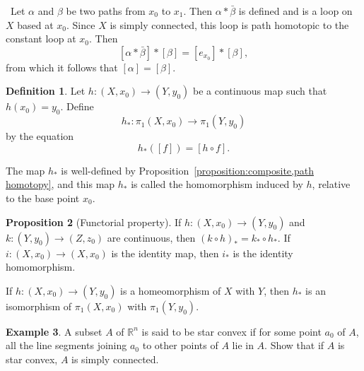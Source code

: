 \documentclass[12pt,a4paper]{book}
\newenvironment{prooff}{{\noindent\it\textcolor{cyan!40!black}{Proof}:}\,}{\par}
\theoremstyle{definition}
\newtheorem{defn}{Definition}[section]
\newtheorem{prop}[defn]{Proposition}
\newtheorem{exam}[defn]{Example}
\begin{document}
\begin{prooff}
    Let $\alpha$ and $\beta$ be two paths from $x_0$ to $x_1$. Then $\alpha * \bar{\beta}$ is defined and is a loop on $X$ based at $x_0$. Since $X$ is simply connected, this loop is path homotopic to the constant loop at $x_0$. Then
    $$
        [\alpha * \bar{\beta}] *[\beta]=\left[e_{x_0}\right] *[\beta],
    $$
    from which it follows that $[\alpha]=[\beta]$.
\end{prooff}
\begin{defn}
    Let $h:\left(X, x_0\right) \rightarrow\left(Y, y_0\right)$ be a continuous map such that $h(x_0)=y_0$. Define
    $$
        h_*: \pi_1\left(X, x_0\right) \longrightarrow \pi_1\left(Y, y_0\right)
    $$
    by the equation
    $$
        h_*([f])=[h \circ f] .
    $$

    The map $h_*$ is well-defined by Proposition~\ref{proposition:composite,path homotopy}, and this map $h_*$ is called the homomorphism induced by $h$, relative to the base point $x_0$.
\end{defn}
\begin{prop}[Functorial property]
    If $h:\left(X, x_0\right) \rightarrow\left(Y, y_0\right)$ and $k:\left(Y, y_0\right) \rightarrow\left(Z, z_0\right)$ are continuous, then $(k \circ h)_*=k_* \circ h_*$. If $i:\left(X, x_0\right) \rightarrow\left(X, x_0\right)$ is the identity map, then $i_*$ is the identity homomorphism.

    If $h:\left(X, x_0\right) \rightarrow\left(Y, y_0\right)$ is a homeomorphism of $X$ with $Y$, then $h_*$ is an isomorphism of $\pi_1\left(X, x_0\right)$ with $\pi_1\left(Y, y_0\right)$.
\end{prop}
\begin{exam}
    A subset $A$ of $\mathbb{R}^n$ is said to be star convex if for some point $a_0$ of $A$, all the line segments joining $a_0$ to other points of $A$ lie in $A$. Show that if $A$ is star convex, $A$ is simply connected.
\end{exam}

\newpage 
\end{document}
